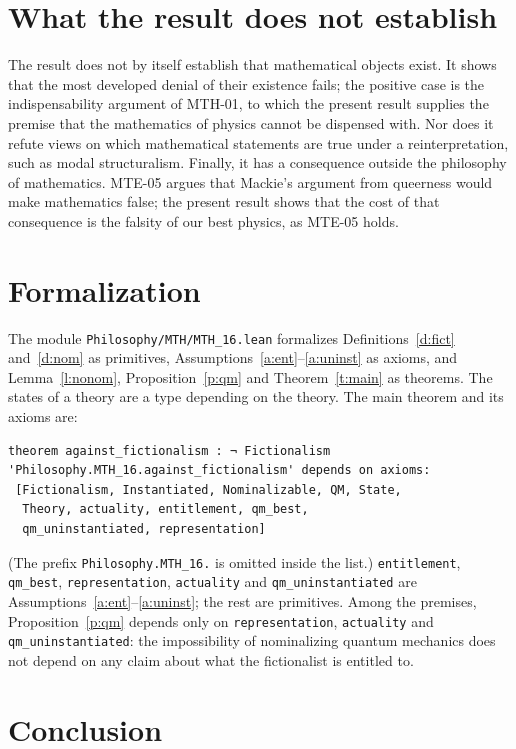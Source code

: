\documentclass{situationist-preprint}
\begin{document}
\section{What the result does not establish}

The result does not by itself establish that mathematical objects exist. It shows that the most developed denial of their existence fails; the positive case is the indispensability argument of MTH-01, to which the present result supplies the premise that the mathematics of physics cannot be dispensed with. Nor does it refute views on which mathematical statements are true under a reinterpretation, such as modal structuralism. Finally, it has a consequence outside the philosophy of mathematics. MTE-05 argues that Mackie's argument from queerness would make mathematics false; the present result shows that the cost of that consequence is the falsity of our best physics, as MTE-05 holds.

\section{Formalization}

The module \nolinkurl{Philosophy/MTH/MTH_16.lean} formalizes Definitions~\ref{d:fict} and~\ref{d:nom} as primitives, Assumptions~\ref{a:ent}--\ref{a:uninst} as axioms, and Lemma~\ref{l:nonom}, Proposition~\ref{p:qm} and Theorem~\ref{t:main} as theorems. The states of a theory are a type depending on the theory. The main theorem and its axioms are:

\begin{lstlisting}
theorem against_fictionalism : ¬ Fictionalism
'Philosophy.MTH_16.against_fictionalism' depends on axioms:
 [Fictionalism, Instantiated, Nominalizable, QM, State,
  Theory, actuality, entitlement, qm_best,
  qm_uninstantiated, representation]
\end{lstlisting}

(The prefix \texttt{Philosophy.MTH\_16.} is omitted inside the list.) \texttt{entitlement}, \texttt{qm\_best}, \texttt{representation}, \texttt{actuality} and \texttt{qm\_uninstantiated} are Assumptions~\ref{a:ent}--\ref{a:uninst}; the rest are primitives. Among the premises, Proposition~\ref{p:qm} depends only on \texttt{representation}, \texttt{actuality} and \texttt{qm\_uninstantiated}: the impossibility of nominalizing quantum mechanics does not depend on any claim about what the fictionalist is entitled to.

\section{Conclusion}
\end{document}
